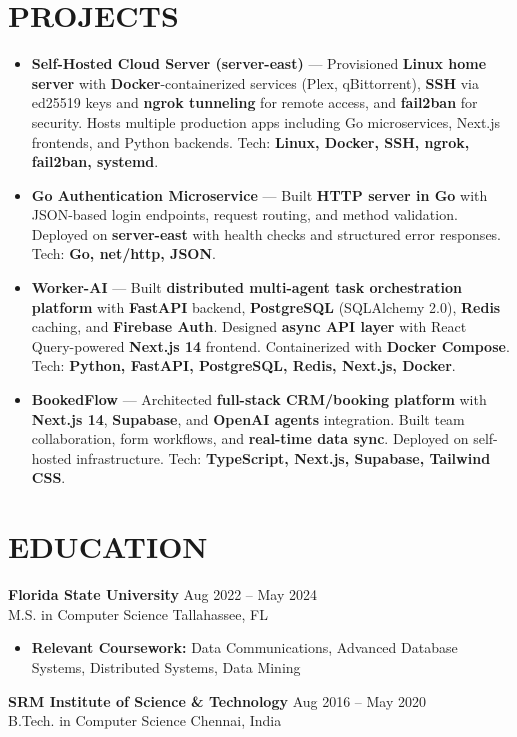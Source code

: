 \documentclass[letterpaper,10pt]{article}
\newcommand{\resumeItem}[1]{\item\small #1}
\newcommand{\resumeSubheading}[4]{
  \vspace{6pt}
  \noindent
  \textbf{#1} \hfill {\footnotesize #2} \\
  [-1pt]
  \noindent
  \small #3 \hfill {\small #4}
  \vspace{3pt}
}
\newcommand{\resumeItemsStart}{\vspace{-2pt}\begin{itemize}}
\newcommand{\resumeItemsEnd}{\end{itemize}\vspace{6pt}}
\begin{document}
\section{\textcolor{metablue}{PROJECTS}}
\vspace{-3pt}
\begin{tcolorbox}[colback=white,colframe=metablue,boxrule=0.8pt,arc=2pt,left=4pt,right=4pt,top=2pt,bottom=2pt,breakable]
\begin{itemize}
\resumeItem{\textbf{Self-Hosted Cloud Server (server-east)} --- Provisioned \textbf{Linux home server} with \textbf{Docker}-containerized services (Plex, qBittorrent), \textbf{SSH} via ed25519 keys and \textbf{ngrok tunneling} for remote access, and \textbf{fail2ban} for security. Hosts multiple production apps including Go microservices, Next.js frontends, and Python backends. Tech: \textbf{Linux, Docker, SSH, ngrok, fail2ban, systemd}.}

\resumeItem{\textbf{Go Authentication Microservice} --- Built \textbf{HTTP server in Go} with JSON-based login endpoints, request routing, and method validation. Deployed on \textbf{server-east} with health checks and structured error responses. Tech: \textbf{Go, net/http, JSON}.}

\resumeItem{\textbf{Worker-AI} --- Built \textbf{distributed multi-agent task orchestration platform} with \textbf{FastAPI} backend, \textbf{PostgreSQL} (SQLAlchemy 2.0), \textbf{Redis} caching, and \textbf{Firebase Auth}. Designed \textbf{async API layer} with React Query-powered \textbf{Next.js 14} frontend. Containerized with \textbf{Docker Compose}. Tech: \textbf{Python, FastAPI, PostgreSQL, Redis, Next.js, Docker}.}

\resumeItem{\textbf{BookedFlow} --- Architected \textbf{full-stack CRM/booking platform} with \textbf{Next.js 14}, \textbf{Supabase}, and \textbf{OpenAI agents} integration. Built team collaboration, form workflows, and \textbf{real-time data sync}. Deployed on self-hosted infrastructure. Tech: \textbf{TypeScript, Next.js, Supabase, Tailwind CSS}.}

\end{itemize}
\end{tcolorbox}
\vspace{-5pt}


\section{\textcolor{metablue}{EDUCATION}}
\vspace{-10pt}
\resumeSubheading
{Florida State University}{Aug 2022 -- May 2024}
{M.S. in Computer Science}{Tallahassee, FL}
\resumeItemsStart
\resumeItem{\textbf{Relevant Coursework:} Data Communications, Advanced Database Systems, Distributed Systems, Data Mining}
\resumeItemsEnd
\vspace{-5pt}
\resumeSubheading
{SRM Institute of Science \& Technology}{Aug 2016 -- May 2020}
{B.Tech. in Computer Science}{Chennai, India}
\vspace{-10pt}
\end{document}
